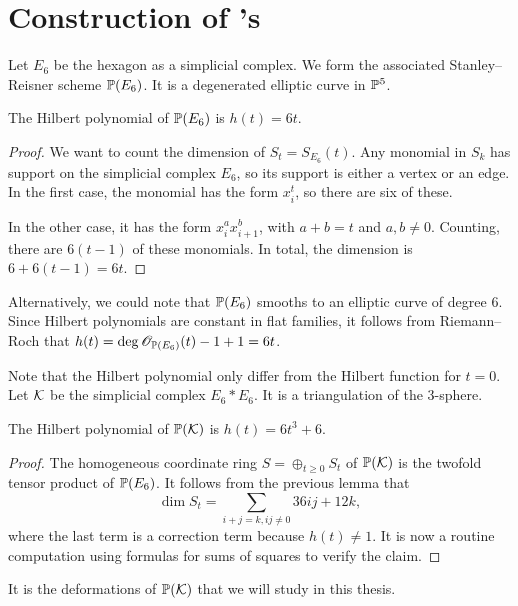 \chapter{Construction of \CY's}
\label{sec:constructions}

Let $E_6$ be the hexagon as a simplicial complex. We form the associated Stanley--Reisner scheme $\P(E_6)$. It is a degenerated elliptic curve in $\P^5$.

\begin{lemma}
The Hilbert polynomial of $\P(E_6)$ is $h(t)=6t$.
\end{lemma}
\begin{proof}
We want to count the dimension of $S_t=S_{E_6}(t)$. Any monomial in $S_k$ has support on the simplicial complex $E_6$, so its support is either a vertex or an edge. In the first case, the monomial has the form $x_i^t$, so there are six of these.

In the other case, it has the form $x_i^ax_{i+1}^b$, with $a+b=t$ and $a,b \neq 0$. Counting, there are $6(t-1)$ of these monomials. In total, the dimension is $6+6(t-1)=6t$.
\end{proof}
\begin{remark}
Alternatively, we could note that $\P(E_6)$ smooths to an elliptic curve of degree $6$. Since Hilbert polynomials are constant in flat families, it follows from Riemann--Roch that $h(t)=\deg \OO_{\P(E_6)}(t)-1+1=6t$.
\end{remark}

Note that the Hilbert polynomial only differ from the Hilbert function for $t=0$. Let $\K$ be the simplicial complex $E_6 \ast E_6$. It is a triangulation of the 3-sphere.

\begin{lemma}
The Hilbert polynomial of $\P(\K)$ is $h(t)=6t^3+6$.
\end{lemma}
\begin{proof}
The homogeneous coordinate ring $S=\oplus_{t \geq 0} S_t$ of $\P(\K)$ is the twofold tensor product of $\P(E_6)$. It follows from the previous lemma that
\[
\dim S_t = \sum_{i+j=k, ij \neq 0} 36ij + 12k,
\]
where the last term is a correction term because $h(t) \neq 1$. It is now a routine computation using formulas for sums of squares to verify the claim.
\end{proof}

It is the deformations of $\P(\K)$ that we will study in this thesis. 

